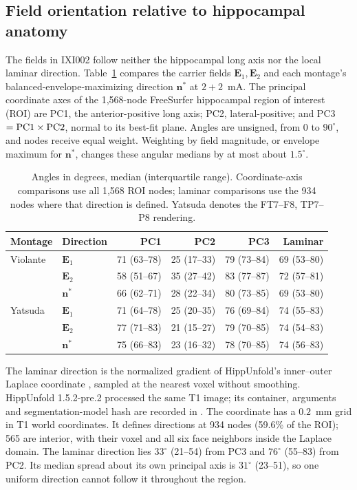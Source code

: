 \subsection{Field orientation relative to hippocampal anatomy}\label{supp:fem-orientation}
The fields in IXI002 follow neither the hippocampal long axis nor the local
laminar direction. Table~\ref{tab:fem-orientation} compares the carrier fields
$\mathbf E_1,\mathbf E_2$ and each montage's balanced-envelope-maximizing
direction $\mathbf n^*$ at $2+2$~mA.
The principal coordinate axes of the 1,568-node FreeSurfer hippocampal region
of interest (ROI) are PC1, the anterior-positive long axis; PC2, lateral-positive; and
PC3$={\rm PC1}\times{\rm PC2}$, normal to its best-fit plane. Angles are
unsigned, from $0$ to $90^\circ$, and nodes receive equal weight.
Weighting by field magnitude, or envelope maximum for $\mathbf n^*$,
changes these angular medians by at most about $1.5^\circ$.

\begin{table}[htbp]
\centering\small
\setlength{\tabcolsep}{3pt}
\begin{tabular}{@{}llrrrr@{}}
\toprule
Montage & Direction & PC1 & PC2 & PC3 & Laminar\\
\midrule
Violante & $\mathbf E_1$ & 71 (63--78) & 25 (17--33) & 79 (73--84) & 69 (53--80)\\
 & $\mathbf E_2$ & 58 (51--67) & 35 (27--42) & 83 (77--87) & 72 (57--81)\\
 & $\mathbf n^*$ & 66 (62--71) & 28 (22--34) & 80 (73--85) & 69 (53--80)\\
Yatsuda & $\mathbf E_1$ & 71 (64--78) & 25 (20--35) & 76 (69--84) & 74 (55--83)\\
 & $\mathbf E_2$ & 77 (71--83) & 21 (15--27) & 79 (70--85) & 74 (54--83)\\
 & $\mathbf n^*$ & 75 (66--83) & 23 (16--32) & 78 (70--85) & 74 (56--83)\\
\bottomrule
\end{tabular}
\caption{Angles in degrees, median (interquartile range). Coordinate-axis
comparisons use all 1,568 ROI nodes; laminar comparisons use the 934 nodes
where that direction is defined. Yatsuda denotes the FT7--F8, TP7--P8
rendering.}
\label{tab:fem-orientation}
\end{table}

The laminar direction is the normalized gradient of HippUnfold's inner--outer
Laplace coordinate \cite{dekraker2022}, sampled at the nearest voxel without
smoothing. HippUnfold 1.5.2-pre.2 processed the same T1 image; its container,
arguments and segmentation-model hash are recorded in
. The coordinate has a $0.2$~mm grid
in T1 world coordinates. It defines directions at 934 nodes (59.6\% of the
ROI); 565 are interior, with their voxel and all six face neighbors inside
the Laplace domain. The laminar direction lies $33^\circ$ (21--54) from PC3
and $76^\circ$ (55--83) from PC2. Its median spread about its own principal
axis is $31^\circ$ (23--51), so one uniform direction cannot follow it
throughout the region.

